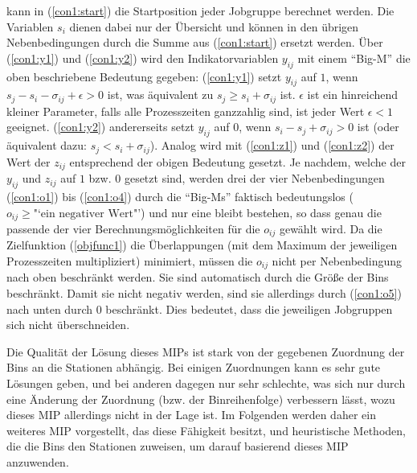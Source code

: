 \documentclass{scrreprt}
\begin{document}
kann in (\ref{con1:start}) die Startposition jeder Jobgruppe berechnet werden.
Die Variablen $s_i$ dienen dabei nur der Übersicht und können in den übrigen 
Nebenbedingungen durch die Summe aus (\ref{con1:start}) ersetzt werden.
Über (\ref{con1:y1}) und (\ref{con1:y2}) wird den Indikatorvariablen $y_{ij}$ 
mit einem "`Big-M"' die oben beschriebene Bedeutung gegeben:
(\ref{con1:y1}) setzt $y_{ij}$ auf $1$, wenn $s_j-s_i-\sigma_{ij}+\epsilon > 0$ ist,
was äquivalent zu $s_j \geq s_i+\sigma_{ij}$ ist.
$\epsilon$ ist ein hinreichend kleiner Parameter, falls alle Prozesszeiten ganzzahlig sind, ist jeder Wert $\epsilon<1$ geeignet.
(\ref{con1:y2}) andererseits setzt $y_{ij}$ auf $0$, wenn $s_i-s_j+\sigma_{ij} > 0$ ist (oder äquivalent dazu: $s_j < s_i+\sigma_{ij}$).
Analog wird mit (\ref{con1:z1}) und (\ref{con1:z2}) der Wert der $z_{ij}$ entsprechend der obigen Bedeutung gesetzt.
Je nachdem, welche der $y_{ij}$ und $z_{ij}$ auf $1$ bzw. $0$ gesetzt sind, 
werden drei der vier Nebenbedingungen (\ref{con1:o1}) bis (\ref{con1:o4}) durch die "`Big-Ms"' faktisch bedeutungslos ($o_{ij}\geq \text{"`ein negativer Wert"'}$)
und nur eine bleibt bestehen, so dass genau die passende der vier Berechnungsmöglichkeiten für die $o_{ij}$ gewählt wird.
Da die Zielfunktion (\ref{objfunc1}) die Überlappungen (mit dem Maximum der jeweiligen Prozesszeiten multipliziert) minimiert,
müssen die $o_{ij}$ nicht per Nebenbedingung nach oben beschränkt werden.
Sie sind automatisch durch die Größe der Bins beschränkt.
Damit sie nicht negativ werden, sind sie allerdings durch (\ref{con1:o5}) nach unten durch $0$ beschränkt.
Dies bedeutet, dass die jeweiligen Jobgruppen sich nicht überschneiden.

Die Qualität der Lösung dieses MIPs ist stark von der gegebenen Zuordnung der Bins an die Stationen abhängig.
Bei einigen Zuordnungen kann es sehr gute Lösungen geben, und bei anderen dagegen nur sehr schlechte, was sich nur durch eine
Änderung der Zuordnung (bzw. der Binreihenfolge) verbessern lässt, wozu dieses MIP allerdings nicht in der Lage ist.
Im Folgenden werden daher ein weiteres MIP vorgestellt, das diese Fähigkeit besitzt, und heuristische Methoden,
die die Bins den Stationen zuweisen, um darauf basierend dieses MIP anzuwenden.
\end{document}
